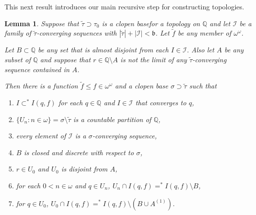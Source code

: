 \documentclass{amsart}
\newtheorem{lemma}[thm]{Lemma}
\theoremstyle{definition}
\theoremstyle{remark}
\begin{document}
This next result introduces our main recursive step for constructing
topologies.

\begin{lemma} Suppose that $\tilde \tau \supset \tau_0$ is a
clopen base\label{mainLemma} for a topology on $\mathbb Q$ and let $\mathcal I$
be a family of $\tilde \tau $-converging sequences with $
|\tilde \tau | + |\mathcal I|<\mathfrak b$. Let $\tilde f$ be any
member of $\omega^\omega$.

Let $B\subset \mathbb Q$ be any set that is almost disjoint from each $I\in \mathcal I$.
Also let $A$ be any subset of $\mathbb Q$ and suppose that $r\in \mathbb Q\setminus A$
is not the limit of any  $\tilde \tau $-converging sequence contained in $A$.
 \medskip

 Then there is a function $\tilde f\leq f\in \omega^\omega$ and a
 clopen base $\sigma\supset \tilde \tau$ such that
 \begin{enumerate}
 \item   $I\subset^* I(q,f)$ for each $q\in \mathbb Q$ and $I\in\mathcal I$ that converges
 to $q$,
 \item $\{U_n: n\in\omega\} = \sigma\setminus \tilde \tau$ is a countable partition of $\mathbb Q$,
 \item every element of $\mathcal I$ is a $\sigma$-converging sequence,
 \item $B$ is closed and discrete with respect to $\sigma$,
 \item $r\in U_0$  and $U_0$ is disjoint from  $A$,
 \item for each $0<n\in\omega$ and $ q\in   U_n$,  
    $U_n\cap I(q,f) =^* I(q,f)\setminus B$,
  \item for $q\in U_0 $, 
   $U_0\cap I(q,f) =^* I(q,f) \setminus (B\cup A^{(1)})$.
 \end{enumerate}
 \end{lemma}
\end{document}
